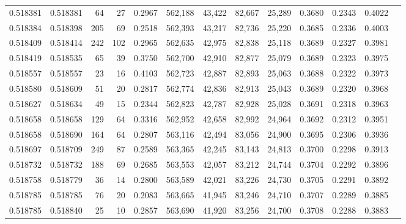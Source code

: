 \begin{tabular}{rrrrrrrrrrrrr}
0.518381 & 0.518381 &    64 &    27 &                                     0.2967 & 562,188 &  43,422 &  82,667 &  25,289 & 0.3680 & 0.2343 & 0.4022 \\
0.518384 & 0.518398 &   205 &    69 &                                     0.2518 & 562,393 &  43,217 &  82,736 &  25,220 & 0.3685 & 0.2336 & 0.4003 \\
0.518409 & 0.518414 &   242 &   102 &                                     0.2965 & 562,635 &  42,975 &  82,838 &  25,118 & 0.3689 & 0.2327 & 0.3981 \\
0.518419 & 0.518535 &    65 &    39 &                                     0.3750 & 562,700 &  42,910 &  82,877 &  25,079 & 0.3689 & 0.2323 & 0.3975 \\
0.518557 & 0.518557 &    23 &    16 &                                     0.4103 & 562,723 &  42,887 &  82,893 &  25,063 & 0.3688 & 0.2322 & 0.3973 \\
0.518580 & 0.518609 &    51 &    20 &                                     0.2817 & 562,774 &  42,836 &  82,913 &  25,043 & 0.3689 & 0.2320 & 0.3968 \\
0.518627 & 0.518634 &    49 &    15 &                                     0.2344 & 562,823 &  42,787 &  82,928 &  25,028 & 0.3691 & 0.2318 & 0.3963 \\
0.518658 & 0.518658 &   129 &    64 &                                     0.3316 & 562,952 &  42,658 &  82,992 &  24,964 & 0.3692 & 0.2312 & 0.3951 \\
0.518658 & 0.518690 &   164 &    64 &                                     0.2807 & 563,116 &  42,494 &  83,056 &  24,900 & 0.3695 & 0.2306 & 0.3936 \\
0.518697 & 0.518709 &   249 &    87 &                                     0.2589 & 563,365 &  42,245 &  83,143 &  24,813 & 0.3700 & 0.2298 & 0.3913 \\
0.518732 & 0.518732 &   188 &    69 &                                     0.2685 & 563,553 &  42,057 &  83,212 &  24,744 & 0.3704 & 0.2292 & 0.3896 \\
0.518758 & 0.518779 &    36 &    14 &                                     0.2800 & 563,589 &  42,021 &  83,226 &  24,730 & 0.3705 & 0.2291 & 0.3892 \\
0.518785 & 0.518785 &    76 &    20 &                                     0.2083 & 563,665 &  41,945 &  83,246 &  24,710 & 0.3707 & 0.2289 & 0.3885 \\
0.518785 & 0.518840 &    25 &    10 &                                     0.2857 & 563,690 &  41,920 &  83,256 &  24,700 & 0.3708 & 0.2288 & 0.3883 \\

\end{tabular}
